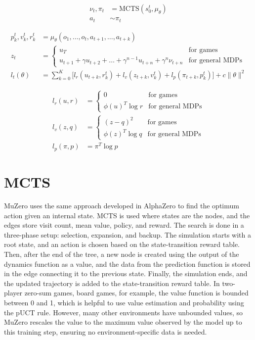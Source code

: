\documentclass{article}
\begin{document}
\begin{align}
    \nu_t, \pi_t &= \text{MCTS}(s_0^t, \mu_\theta) \\
    a_t &\sim \pi_t
\end{align}

\begin{align}
    p_k^t, v_k^t, r_k^t &= \mu_\theta(o_1, \ldots, o_t, a_{t+1}, \ldots, a_{t+k}) \\
    z_t &= 
    \begin{cases} 
        u_T & \text{for games} \\
        u_{t+1} + \gamma u_{t+2} + \ldots + \gamma^{n-1} u_{t+n} + \gamma^n \nu_{t+n} & \text{for general MDPs}
    \end{cases} \\
    l_t(\theta) &=
    \sum_{k=0}^K \big[ l_r(u_{t+k}, r_k^t) + l_v(z_{t+k}, v_k^t) + l_p(\pi_{t+k}, p_k^t) \big] 
    + c \|\theta\|^2
\end{align}

\begin{align}
    l_r(u, r) &= 
    \begin{cases} 
        0 & \text{for games} \\
        \phi(u)^T \log r & \text{for general MDPs}
    \end{cases} \\
    l_v(z, q) &=
    \begin{cases} 
        (z - q)^2 & \text{for games} \\
        \phi(z)^T \log q & \text{for general MDPs}
    \end{cases} \\
    l_p(\pi, p) &= \pi^T \log p
\end{align}

\section*{MCTS}
MuZero uses the same approach developed in AlphaZero to find the optimum action given an internal 
state. MCTS is used where states are the nodes, and the edges store visit count, mean value, policy, and 
reward. The search is done in a three-phase setup: selection, expansion, and backup. The simulation 
starts with a root state, and an action is chosen based on the state-transition reward table. Then, after the end 
of the tree, a new node is created using the output of the dynamics function as a value, and the data from the 
prediction function is stored in the edge connecting it to the previous state. Finally, the simulation 
ends, and the updated trajectory is added to the state-transition reward table. In two-player zero-sum 
games, board games, for example, the value function is bounded between 0 and 1, which is helpful to 
use value estimation and probability using the pUCT rule. However, many other environments have 
unbounded values, so MuZero rescales the value to the maximum value observed by the model up to 
this training step, ensuring no environment-specific data is needed.
\end{document}
